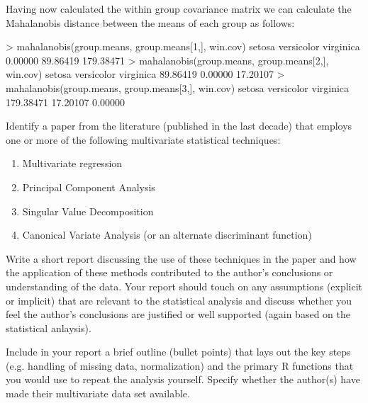 Having now calculated the within group covariance matrix we can calculate the Mahalanobis distance between the means of each group as follows:

\begin{R}
> mahalanobis(group.means, group.means[1,], win.cov)
    setosa versicolor  virginica 
   0.00000   89.86419  179.38471 
> mahalanobis(group.means, group.means[2,], win.cov)
    setosa versicolor  virginica 
  89.86419    0.00000   17.20107 
> mahalanobis(group.means, group.means[3,], win.cov)
    setosa versicolor  virginica 
 179.38471   17.20107    0.00000 
\end{R}

\medskip
\begin{assignment}
\small

Identify a paper from the literature (published in the last decade) that employs one or more of the following multivariate statistical techniques:

\begin{enumerate}
\item Multivariate regression
\item Principal Component Analysis
\item Singular Value Decomposition
\item Canonical Variate Analysis (or an alternate discriminant function)
\end{enumerate}

Write a short report discussing the use of these techniques in the paper and how the application of these methods contributed to the author's conclusions or understanding of the data.  Your report should touch on any assumptions (explicit or implicit) that are relevant to the statistical analysis and discuss whether you feel the author's conclusions are justified or well supported (again based on the statistical anlaysis).

\medskip
Include in your report a brief outline (bullet points) that lays out the key steps (e.g. handling of missing data, normalization) and the primary R functions that you would use to repeat the analysis yourself. Specify whether the author(s) have made their multivariate data set available.


\end{assignment}


